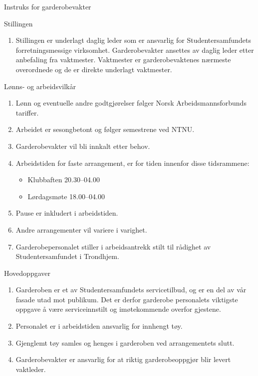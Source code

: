 \begin{instruks*}{Instruks for garderobevakter}
    
    \begin{instruksledd}{Stillingen}
        \begin{enumerate}
            \item Stillingen er underlagt daglig leder som er ansvarlig for Studentersamfundets forretningsmessige virksomhet.
                Garderobevakter ansettes av daglig leder etter anbefaling fra vaktmester. Vaktmester er garderobevaktenes nærmeste
                overordnede og de er direkte underlagt vaktmester.
        \end{enumerate}    
    \end{instruksledd}

    \begin{instruksledd}{Lønns- og arbeidsvilkår}
        \begin{enumerate}
            \item Lønn og eventuelle andre godtgjørelser følger Norsk Arbeidsmannsforbunds tariffer.
            \item Arbeidet er sesongbetont og følger semestrene ved NTNU.
            \item Garderobevakter vil bli innkalt etter behov.
            \item Arbeidstiden for faste arrangement, er for tiden innenfor disse tidsrammene:
                \begin{itemize}
                    \item Klubbaften 20.30--04.00
                    \item Lørdagsmøte 18.00--04.00
                \end{itemize}
            \item Pause er inkludert i arbeidstiden.
            \item Andre arrangementer vil variere i varighet.
            \item Garderobepersonalet stiller i arbeidsantrekk stilt til rådighet av Studentersamfundet i Trondhjem.
        \end{enumerate}    
    \end{instruksledd}

    \begin{instruksledd}{Hovedoppgaver}
        \begin{enumerate}
            \item Garderoben er et av Studentersamfundets servicetilbud, og er en del av vår fasade 
                utad mot publikum. Det er derfor garderobe personalets viktigste oppgave å være serviceinnstilt og 
                imøtekommende overfor gjestene.
            \item Personalet er i arbeidstiden ansvarlig for innhengt tøy.
            \item Gjenglemt tøy samles og henges i garderoben ved arrangementets slutt.
            \item Garderobevakter er ansvarlig for at riktig garderobeoppgjør blir levert vaktleder.
        \end{enumerate}
    \end{instruksledd}


\end{instruks*}
